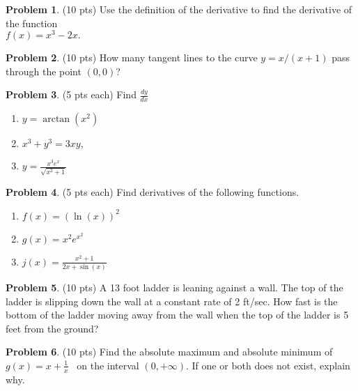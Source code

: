 \documentclass[12pt,letterpaper]{amsart}
\theoremstyle{definition}
\newtheorem{problem}{Problem}[]
\begin{document}
\begin{problem}(10 pts) 
Use the definition of the derivative to find the derivative of the function\\ \hspace*{2cm} $f(x) = x^3-2x.$ 
\end{problem}
\newpage

\begin{problem}(10 pts)
How many tangent lines to the curve $y=x/(x+1)$ pass through the point $(0,0)$?
\vspace{2in}
\end{problem}
\begin{problem}(5 pts each) 
Find $\displaystyle \frac{dy}{dx}$
\begin{enumerate}
\item $\displaystyle y= \arctan(x^2)$
\vspace*{1.5in}


\item $x^3+y^3=3xy, $
\vspace{1.5in}

\item $\displaystyle y=\frac{x^3 e^x}{\sqrt{x^2+1}}$
\end{enumerate}
\end{problem}
\newpage

\begin{problem}(5 pts each) 
Find derivatives of the following functions.

\begin{enumerate}
\item $\displaystyle f(x) = \left(\ln(x)\right)^2$
\vspace{2.25in}
\item $\displaystyle g(x) = x^2e^{x^2}$
\vspace{2.25in}
\item $\displaystyle j(x) = \frac{x^2+1}{2x+\sin(x)}$
\end{enumerate}
\end{problem}
\newpage

\begin{problem}(10 pts)
A 13 foot ladder is leaning against a wall. The top of the ladder is slipping down the wall at a constant rate of 2 
ft/sec. How fast is the bottom of the ladder moving away from the wall when the top of the ladder is 5 feet from the ground?
\end{problem}
\vspace{4in}
\begin{problem}(10 pts) 
Find the absolute maximum and absolute minimum of  \mbox{$\displaystyle g(x) = x+\frac{1}{x}$ } on the interval $ (0, +\infty).$ If one or both does not exist, explain why.


\vspace{4in}
\end{problem}
\end{document}
